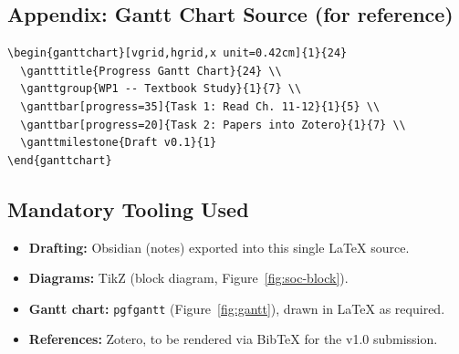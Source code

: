 \documentclass[11pt,a4paper]{article}
\begin{document}
\subsection*{Appendix: Gantt Chart Source (for reference)}
\begin{lstlisting}[style=codebox,caption={Excerpt of the \texttt{pgfgantt} source used to
produce Figure~\ref{fig:gantt}.},label={lst:gantt-source},language={[LaTeX]TeX}]
\begin{ganttchart}[vgrid,hgrid,x unit=0.42cm]{1}{24}
  \gantttitle{Progress Gantt Chart}{24} \\
  \ganttgroup{WP1 -- Textbook Study}{1}{7} \\
  \ganttbar[progress=35]{Task 1: Read Ch. 11-12}{1}{5} \\
  \ganttbar[progress=20]{Task 2: Papers into Zotero}{1}{7} \\
  \ganttmilestone{Draft v0.1}{1}
\end{ganttchart}
\end{lstlisting}

\subsection*{Mandatory Tooling Used}
\begin{itemize}[nosep]
  \item \textbf{Drafting:} Obsidian (notes) exported into this single \LaTeX{} source.
  \item \textbf{Diagrams:} TikZ (block diagram, Figure~\ref{fig:soc-block}).
  \item \textbf{Gantt chart:} \texttt{pgfgantt} (Figure~\ref{fig:gantt}), drawn in \LaTeX{}
        as required.
  \item \textbf{References:} Zotero, to be rendered via BibTeX for the v1.0 submission.
\end{itemize}
\end{document}
